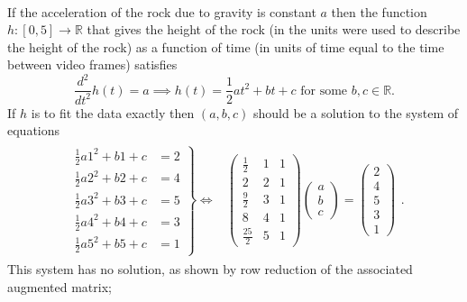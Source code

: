 \documentclass[12pt]{article}
\def\R{{\mathbb{R}}}
\def\b{\beta}
\def\bea{\begin{align}}
\def\eea{\end{align}}
\def\nn{\nonumber}
\def\bv{\left(\begin{array}{c}}
\def\ev{\end{array}\right) }
\def\LR{\Leftrightarrow}
\begin{document}
\\
If the acceleration of the rock due to gravity is constant $a$ then the function $h:[0,5]\to \mathbb{R}$ that gives the height of the rock (in the units were used to describe the height of the rock) as a function of time (in units of time equal to the time between video frames) satisfies 
\[ \frac{d^2}{dt^2} h(t)=a \implies h(t)=\frac12 a t^2+bt+c \text{~for~some~}b,c\in \R.\]
If $h$ is to fit the data exactly then $(a,b,c)$ should be a solution to the system of equations 
\bea \nn
\begin{array}{cc}
\left.
\begin{array}{cc}
\frac12a 1^2+b1+c &= 2 \\
\frac12a 2^2+b2+c &= 4 \\
\frac12a 3^2+b3+c &= 5 \\
\frac12a 4^2+b4+c &= 3 \\
\frac12a 5^2+b5+c &= 1 
\end{array}
\right\}\LR
& 
\begin{pmatrix}
\frac12 &1&1\\
2&2&1\\
\frac92 &3&1\\
8&4&1\\
\frac{25}{2} &5&1
\end{pmatrix}
\bv a\\b\\c \ev = \bv 2\\4\\5\\3\\1\ev
\end{array}.
\eea
This system has no solution, as shown by row reduction of the associated augmented matrix; 
\end{document}
